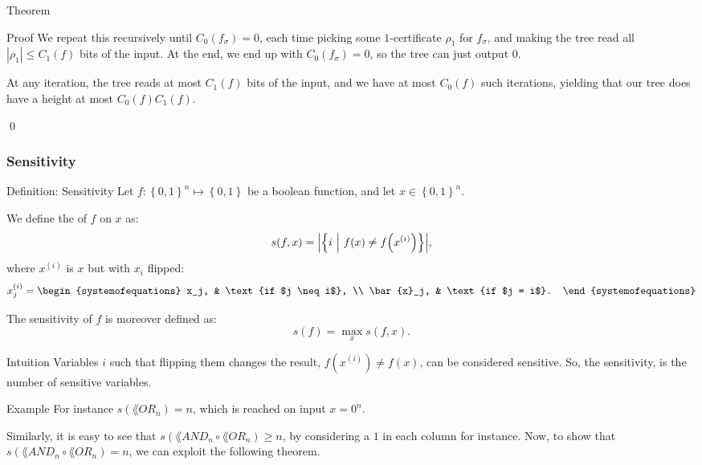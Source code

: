 \documentclass[a4paper]{article}
\begin{document}
\begin{parag}{Theorem}
\begin{subparag}{Proof}
        We repeat this recursively until $C_0\left(f_{\sigma}\right) = 0$, each time picking some $1$-certificate $\rho_1$ for $f_{\sigma}$, and making the tree read all $\left|\rho_1\right| \leq C_1\left(f\right)$ bits of the input. At the end, we end up with $C_0\left(f_{\sigma}\right) = 0$, so the tree can just output $0$.

        At any iteration, the tree reads at most $C_1\left(f\right)$ bits of the input, and we have at most $C_0\left(f\right)$ such iterations, yielding that our tree does have a height at most $C_0\left(f\right) C_1\left(f\right)$.

        \qed
    \end{subparag}
\end{parag}

\subsubsection{Sensitivity}

\begin{parag}{Definition: Sensitivity}
    Let $f: \left\{0, 1\right\}^n \mapsto \left\{0, 1\right\}$ be a boolean function, and let $x \in \left\{0, 1\right\}^n$.

    We define the  of $f$ on $x$ as: 
    \[s\left(f, x\right) = \left|\left\{i \suchthat f\left(x\right) \neq f\left(x^{\left(i\right)}\right)\right\}\right|,\]
    where $x^{\left(i\right)}$ is $x$ but with $x_i$ flipped: 
    \[x^{\left(i\right)}_j = \begin{systemofequations} x_j, & \text{if $j \neq i$}, \\ \bar{x}_j, & \text{if $j = i$}. \end{systemofequations}\]

    The sensitivity of $f$ is moreover defined as: 
    \[s\left(f\right) = \max_x s\left(f, x\right).\]

    \begin{subparag}{Intuition}
        Variables $i$ such that flipping them changes the result, $f\left(x^{\left(i\right)}\right) \neq f\left(x\right)$, can be considered sensitive. So, the sensitivity, is the number of sensitive variables.
    \end{subparag}

    \begin{subparag}{Example}
        For instance $s\left(\lang{OR}_n\right) = n$, which is reached on input $x = 0^n$.

        Similarly, it is easy to see that $s\left(\lang{AND}_n \circ \lang{OR}_n\right) \geq n$, by considering a $1$ in each column for instance. Now, to show that $s\left(\lang{AND}_n \circ \lang{OR}_n\right) = n$, we can exploit the following theorem.
    \end{subparag}
\end{parag}
\end{document}
